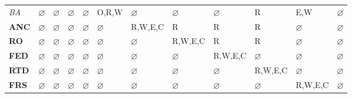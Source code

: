 \documentclass[10pt,journal,compsoc]{IEEEtran}
\begin{document}
\begin{table}[]
{\begin{tabular}{l|lllllllllll}
      \textit{BA}  & $\varnothing$                        & $\varnothing$                        & $\varnothing$                        & $\varnothing$                        & O,R,W                                & $\varnothing$                        & $\varnothing$                        & $\varnothing$                        & R                                    & {\color[HTML]{CB0000} E,W}             & {\color[HTML]{009901} $\varnothing$} \\
      \textbf{ANC} & $\varnothing$                        & $\varnothing$                        & $\varnothing$                        & $\varnothing$                        & $\varnothing$                        & R,W,E,C                              & R                                    & R                                    & R                                    & $\varnothing$                        & {\color[HTML]{009901} $\varnothing$} \\
      \textbf{RO}  & $\varnothing$                        & $\varnothing$                        & $\varnothing$                        & $\varnothing$                        & $\varnothing$                        & $\varnothing$                        & R,W,E,C                              & R                                    & R                                    & $\varnothing$                        & {\color[HTML]{009901} $\varnothing$} \\
      \textbf{FED} & $\varnothing$                        & $\varnothing$                        & $\varnothing$                        & $\varnothing$                        & $\varnothing$                        & $\varnothing$                        & $\varnothing$                        & R,W,E,C                              & $\varnothing$                        & $\varnothing$                        & {\color[HTML]{009901} $\varnothing$} \\
      \textbf{RTD} & $\varnothing$                        & $\varnothing$                        & $\varnothing$                        & $\varnothing$                        & $\varnothing$                        & $\varnothing$                        & $\varnothing$                        & $\varnothing$                        & R,W,E,C                              & $\varnothing$                        & {\color[HTML]{009901} $\varnothing$} \\
      \textbf{FRS} & $\varnothing$                        & $\varnothing$                        & $\varnothing$                        & $\varnothing$                        & $\varnothing$                        & $\varnothing$                        & $\varnothing$                        & $\varnothing$                        & $\varnothing$                        & R,W,E,C                              & {\color[HTML]{009901} $\varnothing$} \\

\end{tabular}}
\end{table}
\end{document}
